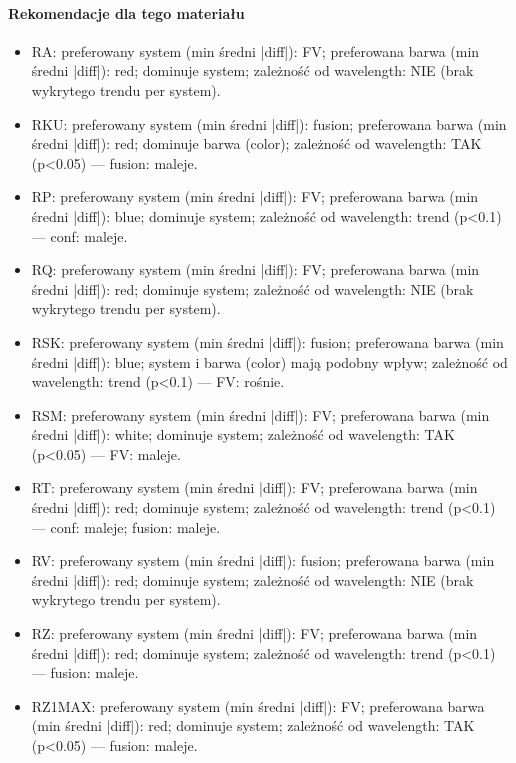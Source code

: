 \documentclass[
  10pt,
]{article}
\begin{document}
\paragraph{Rekomendacje dla tego materiału}
\begin{itemize}
\item RA: preferowany system (min średni |diff|): FV; preferowana barwa (min średni |diff|): red; dominuje system; zależność od wavelength: NIE (brak wykrytego trendu per system).
\item RKU: preferowany system (min średni |diff|): fusion; preferowana barwa (min średni |diff|): red; dominuje barwa (color); zależność od wavelength: TAK (p<0.05) — fusion: maleje.
\item RP: preferowany system (min średni |diff|): FV; preferowana barwa (min średni |diff|): blue; dominuje system; zależność od wavelength: trend (p<0.1) — conf: maleje.
\item RQ: preferowany system (min średni |diff|): FV; preferowana barwa (min średni |diff|): red; dominuje system; zależność od wavelength: NIE (brak wykrytego trendu per system).
\item RSK: preferowany system (min średni |diff|): fusion; preferowana barwa (min średni |diff|): blue; system i barwa (color) mają podobny wpływ; zależność od wavelength: trend (p<0.1) — FV: rośnie.
\item RSM: preferowany system (min średni |diff|): FV; preferowana barwa (min średni |diff|): white; dominuje system; zależność od wavelength: TAK (p<0.05) — FV: maleje.
\item RT: preferowany system (min średni |diff|): FV; preferowana barwa (min średni |diff|): red; dominuje system; zależność od wavelength: trend (p<0.1) — conf: maleje; fusion: maleje.
\item RV: preferowany system (min średni |diff|): fusion; preferowana barwa (min średni |diff|): red; dominuje system; zależność od wavelength: NIE (brak wykrytego trendu per system).
\item RZ: preferowany system (min średni |diff|): FV; preferowana barwa (min średni |diff|): red; dominuje system; zależność od wavelength: trend (p<0.1) — fusion: maleje.
\item RZ1MAX: preferowany system (min średni |diff|): FV; preferowana barwa (min średni |diff|): red; dominuje system; zależność od wavelength: TAK (p<0.05) — fusion: maleje.
\end{itemize}
\end{document}
